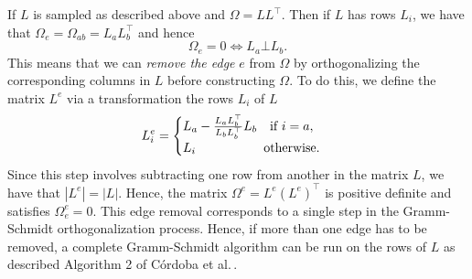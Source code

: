 If $L$ is sampled as described above and $\Omega = L L^\top$. Then if $L$ has rows $L_i$, we have that $\Omega_e = \Omega_{ab} = L_a L_b^\top$ and hence
\begin{equation*}
    \Omega_e = 0 \Leftrightarrow L_a \bot L_b.
\end{equation*}
This means that we can \textit{remove the edge} $e$ from $\Omega$ by orthogonalizing the corresponding columns in $L$ before constructing $\Omega$. To do this, we define the matrix $L^e$ via a transformation the rows $L_i$ of $L$
\begin{equation*}
    L^e_i = \begin{cases}
        L_a - \frac{L_a L_b^\top}{L_b L_b^\top} L_b \ \ {\textrm{ if }} i = a,\\
        L_i \ \ \ \ \ \ \ \ \ \ \ \ \ \ \ {\textrm{ otherwise}}.
    \end{cases}
\end{equation*}
Since this step involves subtracting one row from another in the matrix $L$, we have that $|L^e| = |L|$. Hence, the matrix $\Omega^e = L^e (L^e)^\top$ is positive definite and satisfies $\Omega^e_e = 0$. This edge removal corresponds to a single step in the Gramm-Schmidt orthogonalization process. Hence, if more than one edge has to be removed, a complete Gramm-Schmidt algorithm can be run on the rows of $L$ as described Algorithm 2 of C\'ordoba et al.\,\cite{cordoba2020generating}.